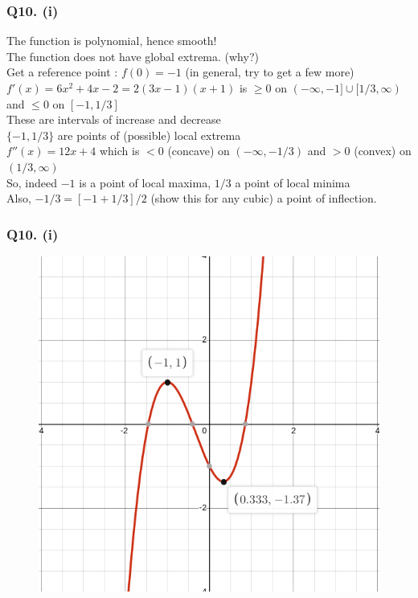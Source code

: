 \documentclass[handout,aspectratio=169]{beamer}
\begin{document}
\begin{frame}
\pause
\frametitle{Q10. (i)}
The function is polynomial, hence smooth! \\ \pause
The function does not have global extrema. (why?) \\ \pause
Get a reference point : $f(0) = -1$ (in general, try to get a few more) \\ \pause
$f'(x) = 6x^2+4x-2 = 2(3x-1)(x+1)$ is $\geq 0$ on $(-\infty,-1]\cup[1/3,\infty)$ and $\leq 0$ on $[-1,1/3]$ \\ \pause
These are intervals of increase and decrease \\ \pause
$\{-1,1/3\}$ are points of (possible) local extrema \\ \pause
$f''(x) = 12x+4$ which is $<0$ (concave) on $(-\infty,-1/3)$ and $>0$ (convex) on $(1/3,\infty)$ \\ \pause
So, indeed $-1$ is a point of local maxima, $1/3$ a point of local minima \\ \pause
Also, $-1/3 = [-1 + 1/3]/2$ (show this for any cubic) a point of inflection.
\end{frame}

\begin{frame}
\pause
\frametitle{Q10. (i)}
\begin{figure}[H]
\includegraphics[scale=0.4]{plot.jpg}
\end{figure}
\end{frame}
\end{document}
